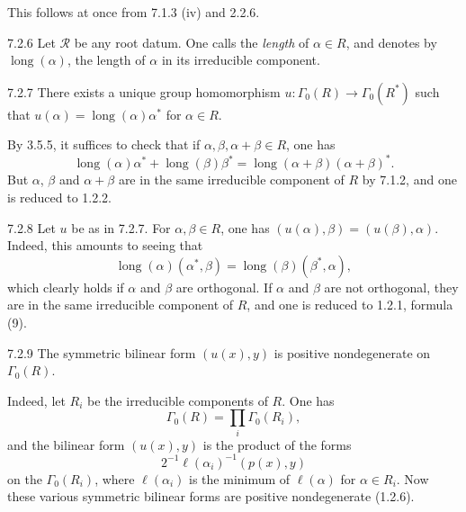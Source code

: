This follows at once from 7.1.3 (iv) and 2.2.6.
\begin{definition}{7.2.6}\label{XXI.7.2.6}
Let $\mathcal R$ be any root datum. One calls the \emph{length} of $\alpha\in R$, and denotes by $\operatorname{long}(\alpha)$, the length of $\alpha$ in its irreducible component.
\end{definition}
\begin{lemma}{7.2.7}\label{XXI.7.2.7}
There exists a unique group homomorphism $u:\Gamma_0(R)\to\Gamma_0(R^*)$ such that $u(\alpha)=\operatorname{long}(\alpha)\alpha^*$ for $\alpha\in R$.
\end{lemma}
By 3.5.5, it suffices to check that if $\alpha,\beta,\alpha+\beta\in R$, one has
\[
\operatorname{long}(\alpha)\alpha^*+\operatorname{long}(\beta)\beta^*
=\operatorname{long}(\alpha+\beta)(\alpha+\beta)^*.
\]
But $\alpha$, $\beta$ and $\alpha+\beta$ are in the same irreducible component of $R$ by 7.1.2, and one is reduced to 1.2.2.
\begin{remark}{7.2.8}\label{XXI.7.2.8}
Let $u$ be as in 7.2.7. For $\alpha,\beta\in R$, one has $(u(\alpha),\beta)=(u(\beta),\alpha)$. Indeed, this amounts to seeing that
\[
\operatorname{long}(\alpha)(\alpha^*,\beta)=\operatorname{long}(\beta)(\beta^*,\alpha),
\]
which clearly holds if $\alpha$ and $\beta$ are orthogonal. If $\alpha$ and $\beta$ are not orthogonal, they are in the same irreducible component of $R$, and one is reduced to 1.2.1, formula (9).
\end{remark}
\begin{remark}{7.2.9}\label{XXI.7.2.9}
The symmetric bilinear form $(u(x),y)$ is positive nondegenerate on $\Gamma_0(R)$.
\end{remark}
Indeed, let $R_i$ be the irreducible components of $R$. One has
\[
\Gamma_0(R)=\prod_i\Gamma_0(R_i),
\]
and the bilinear form $(u(x),y)$ is the product of the forms
\[
2^{-1}\ell(\alpha_i)^{-1}(p(x),y)
\]
on the $\Gamma_0(R_i)$, where $\ell(\alpha_i)$ is the minimum of $\ell(\alpha)$ for $\alpha\in R_i$. Now these various symmetric bilinear forms are positive nondegenerate (1.2.6).

